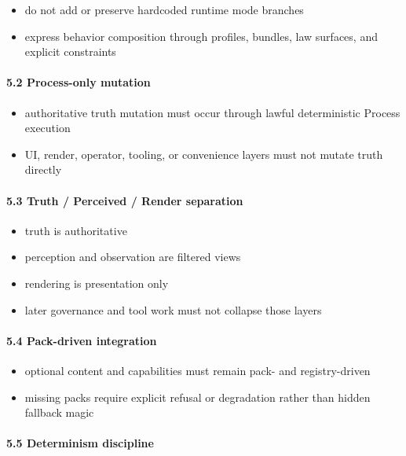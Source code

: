 \documentclass[9pt,a4paper,openany]{book}
\begin{document}
\begin{itemize}
\item do not add or preserve hardcoded runtime mode branches
\item express behavior composition through profiles, bundles, law surfaces, and explicit constraints
\end{itemize}

\paragraph{5.2 Process-only mutation}

\begin{itemize}
\item authoritative truth mutation must occur through lawful deterministic Process execution
\item UI, render, operator, tooling, or convenience layers must not mutate truth directly
\end{itemize}

\paragraph{5.3 Truth / Perceived / Render separation}

\begin{itemize}
\item truth is authoritative
\item perception and observation are filtered views
\item rendering is presentation only
\item later governance and tool work must not collapse those layers
\end{itemize}

\paragraph{5.4 Pack-driven integration}

\begin{itemize}
\item optional content and capabilities must remain pack-\allowbreak{} and registry-\allowbreak{}driven
\item missing packs require explicit refusal or degradation rather than hidden fallback magic
\end{itemize}

\paragraph{5.5 Determinism discipline}
\end{document}
